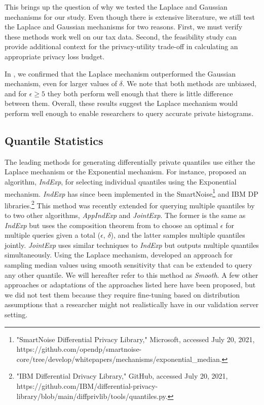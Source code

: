 This brings up the question of why we tested the Laplace and Gaussian mechanisms for our study. Even though there is extensive literature, we still test the Laplace and Gaussian mechanisms for two reasons. First, we must verify these methods work well on our tax data. Second, the feasibility study can provide additional context for the privacy-utility trade-off in calculating an appropriate privacy loss budget.

In \citet{barrientos2021}, we confirmed that the Laplace mechanism outperformed the Gaussian mechanism, even for larger values of $\delta$. We note that both methods are unbiased, and for $\epsilon \geq 5$ they both perform well enough that there is little difference between them. Overall, these results suggest the Laplace mechanism would perform well enough to enable researchers to query accurate private histograms.

\subsection{Quantile Statistics}
The leading methods for generating differentially private quantiles use either the Laplace mechanism or the Exponential mechanism. For instance, \citet{smith2011privacy} proposed an algorithm, \textit{IndExp}, for selecting individual quantiles using the Exponential mechanism. \textit{IndExp} has since been implemented in the SmartNoise\footnote{"SmartNoise Differential Privacy Library," Microsoft, accessed July 20, 2021, https://github.com/opendp/smartnoise-core/tree/develop/whitepapers/mechanisms/exponential\_median.} and IBM DP libraries.\footnote{"IBM Differential Drivacy Library," GitHub, accessed July 20, 2021, https://github.com/IBM/differential-privacy-library/blob/main/diffprivlib/tools/quantiles.py.} This method was recently extended for querying multiple quantiles by \citet{gillenwater2021differentially} to two other algorithms, \textit{AppIndExp} and \textit{JointExp}. The former is the same as \textit{IndExp} but uses the composition theorem from \citet{dong2020optimal} to choose an optimal $\epsilon$ for multiple queries given a total ($\epsilon$, $\delta$), and the latter samples multiple quantiles jointly. \textit{JointExp} uses similar techniques to \textit{IndExp} but outputs multiple quantiles simultaneously. Using the Laplace mechanism, \citet{nissim2007smooth} developed an approach for sampling median values using smooth sensitivity that can be extended to query any other quantile. We will hereafter refer to this method as \textit{Smooth}. A few other approaches or adaptations of the approaches listed here have been proposed, but we did not test them because they require fine-tuning based on distribution assumptions that a researcher might not realistically have in our validation server setting.

